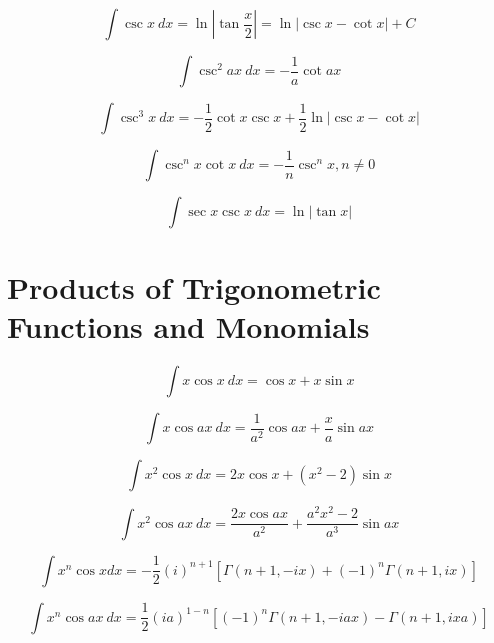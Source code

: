 \documentclass[12pt,letterpaper,leqno]{article}
\begin{document}
\begin{equation}
\int \csc x\ dx = \ln \left | \tan \frac{x}{2} \right|  = \ln | \csc x - \cot x| + C
\end{equation}

\begin{equation}
\int \csc^2 ax\ dx = -\frac{1}{a} \cot ax 
\end{equation}

\begin{equation}
\int \csc^3 x\ dx = -\frac{1}{2}\cot x \csc x + \frac{1}{2} \ln | \csc x - \cot x | 
\end{equation}

\begin{equation}
\int \csc^nx \cot x\ dx = -\frac{1}{n}\csc^n x, n\ne 0
\end{equation}

\begin{equation}
\int \sec x \csc x \ dx = \ln | \tan x | 
\end{equation}


\section*{Products of Trigonometric Functions and Monomials}

\begin{equation}
\int x \cos x \ dx = \cos x + x \sin x 
\end{equation}

\begin{equation}
\int x \cos ax \ dx = \frac{1}{a^2} \cos ax + \frac{x}{a} \sin ax 
\end{equation}

\begin{equation}
\int x^2 \cos x \ dx = 2 x \cos x + \left ( x^2 - 2 \right ) \sin x 
\end{equation}

\begin{equation}
\int x^2 \cos ax \ dx = \frac{2 x \cos ax }{a^2} + \frac{ a^2 x^2 - 2  }{a^3} \sin ax 
\end{equation}

\begin{equation}
\int  x^n \cos x dx = 
-\frac{1}{2}(i)^{n+1}\left [ \Gamma(n+1, -ix) 
+ (-1)^n \Gamma(n+1, ix)\right] 
\end{equation}

\begin{equation}
\int x^n \cos ax \ dx =
 \frac{1}{2}(ia)^{1-n}\left [ (-1)^n  \Gamma(n+1, -iax) 
 -\Gamma(n+1, ixa)\right] 
\end{equation}
\end{document}
